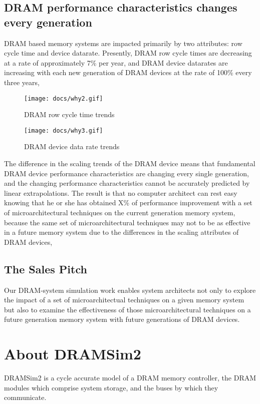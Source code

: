 \documentclass[11pt]{article}
\begin{document}
\subsection{DRAM performance characteristics changes every generation}
DRAM based memory systems are impacted primarily by two attributes: 
row cycle time and device datarate. Presently, DRAM row cycle times are 
decreasing at a rate of approximately 7\% per year, and DRAM device
datarates are increasing with each new generation of DRAM devices at the rate
of 100\% every three years, 
\begin{figure}[h]
\begin{center}
\texttt{[image: docs/why2.gif]}
\caption{DRAM row cycle time trends}
\label{classes}
\end{center}
\end{figure}

\begin{figure}[h]
\begin{center}
\texttt{[image: docs/why3.gif]}
\caption{DRAM device data rate trends}
\label{classes}
\end{center}
\end{figure}
The difference in the scaling trends of the DRAM device means that 
fundamental DRAM device performance characteristics are changing 
every single generation, and the changing performance characteristics
cannot be accurately predicted by linear extrapolations. The result is 
that no computer architect can rest easy knowing that he or she has 
obtained X\% of performance improvement with a set of microarchitectural
techniques on the current generation memory system, because the same set 
of microarchitectural techniques may not to be as effective in a 
future memory system due to the differences in the scaling attributes 
of DRAM devices, 

\subsection{The Sales Pitch}
Our DRAM-system simulation work enables system architects not
only to explore the impact of a set of microarchitectual techniques on a 
given memory system but also to examine the effectiveness of those 
microarchitectural techniques on a future generation memory system with
future generations of DRAM devices.

\section{About DRAMSim2}
  DRAMSim2 is a cycle accurate model of a DRAM memory controller, the DRAM
  modules which comprise system storage, and the buses by which they
  communicate. 
\end{document}
